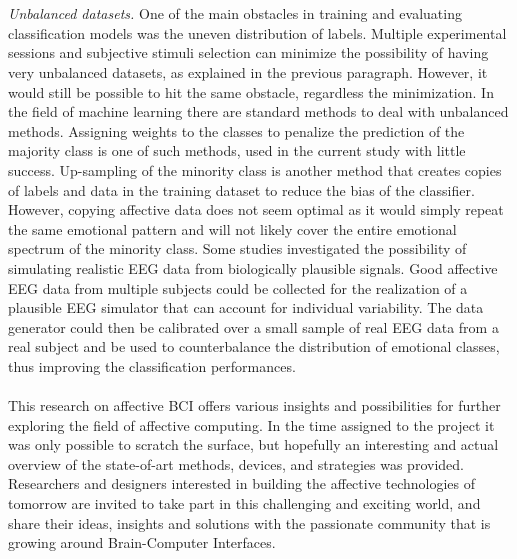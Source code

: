 \\
\\
\emph{Unbalanced datasets.} One of the main obstacles in training and evaluating classification models was the uneven distribution of labels. Multiple experimental sessions and subjective stimuli selection can minimize the possibility of having very unbalanced datasets, as explained in the previous paragraph. However, it would still be possible to hit the same obstacle, regardless the minimization. In the field of machine learning there are standard methods to deal with unbalanced methods. Assigning weights to the classes to penalize the prediction of the majority class is one of such methods, used in the current study with little success. Up-sampling of the minority class is another method that creates copies of labels and data in the training dataset to reduce the bias of the classifier. However, copying affective data does not seem optimal as it would simply repeat the same emotional pattern and will not likely cover the entire emotional spectrum of the minority class. Some studies investigated the possibility of simulating realistic \ac{EEG} data \cite{barzegaran_eegsourcesim_2019} from biologically plausible signals. Good affective \ac{EEG} data from multiple subjects could be collected for the realization of a plausible \ac{EEG}  simulator that can account for individual variability. The data generator could then be calibrated over a small sample of real \ac{EEG}  data from a real subject and be used to counterbalance the distribution of emotional classes, thus improving the classification performances.
\\
\\
This research on affective \ac{BCI} offers various insights and possibilities for further exploring the field of affective computing. In the time assigned to the project it was only possible to scratch the surface, but hopefully an interesting and actual overview of the state-of-art methods, devices, and strategies was provided. Researchers and designers interested in building the affective technologies of tomorrow are invited to take part in this challenging and exciting world, and share their ideas, insights and solutions with the passionate community that is growing around Brain-Computer Interfaces.
